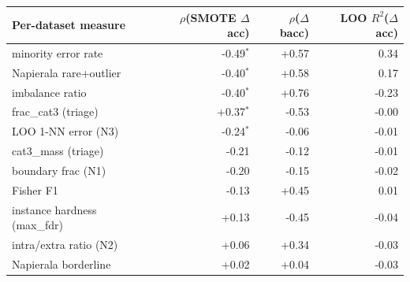 \begin{tabular}{lrrr}
\toprule
Per-dataset measure & $\rho$(SMOTE $\Delta$acc) & $\rho$($\Delta$bacc) & LOO $R^2$($\Delta$acc) \\
\midrule
minority error rate & -0.49$^{*}$ & +0.57 & 0.34 \\
Napierala rare+outlier & -0.40$^{*}$ & +0.58 & 0.17 \\
imbalance ratio & -0.40$^{*}$ & +0.76 & -0.23 \\
frac\_cat3 (triage) & +0.37$^{*}$ & -0.53 & -0.00 \\
LOO 1-NN error (N3) & -0.24$^{*}$ & -0.06 & -0.01 \\
cat3\_mass (triage) & -0.21 & -0.12 & -0.01 \\
boundary frac (N1) & -0.20 & -0.15 & -0.02 \\
Fisher F1 & -0.13 & +0.45 & 0.01 \\
instance hardness (max\_fdr) & +0.13 & -0.45 & -0.04 \\
intra/extra ratio (N2) & +0.06 & +0.34 & -0.03 \\
Napierala borderline & +0.02 & +0.04 & -0.03 \\
\bottomrule
\end{tabular}
